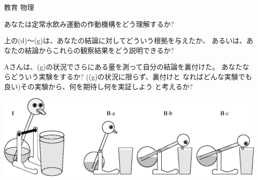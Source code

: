 \documentclass[fleqn]{jbook}
\begin{document}
\begin{question}{教育 物理}{}
\begin{subquestions}
  \begin{subsubquestions}
  \SubSubQuestion
    あなたは定常水飲み運動の作動機構をどう理解するか?

  \SubSubQuestion
    上の(d)〜(g)は、あなたの結論に対してどういう根拠を与えたか、
    あるいは、あなたの結論からこれらの観察結果をどう説明できるか?

  \SubSubQuestion
    Aさんは、(g)の状況でさらにある量を測って自分の結論を裏付けた。
    あなたならどういう実験をするか? ((g)の状況に限らず、裏付けと
    なればどんな実験でも良い)その実験から、何を期待し何を実証しよう
    と考えるか?
  \end{subsubquestions}

  \begin{flushleft}
    \hspace{-5mm}\mbox{\includegraphics[clip]{1995phys-2.eps}}
  \end{flushleft}

\end{subquestions}
\end{question}
\end{document}
